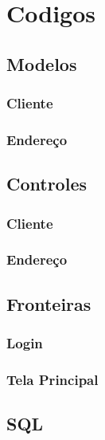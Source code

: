 \section{Codigos}


\subsection{Modelos}

\subsubsection{Cliente}

\subsubsection{Endereço}



\subsection{Controles}

\subsubsection{Cliente}

\subsubsection{Endereço}



\subsection{Fronteiras}

\subsubsection{Login}

\subsubsection{Tela Principal}



\subsection{SQL}
